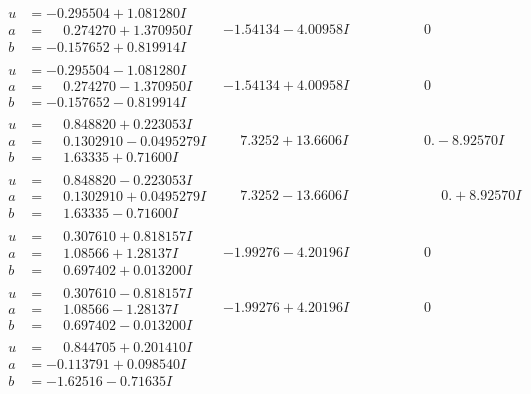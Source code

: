 \documentclass[1p]{elsarticle_modified}
\theoremstyle{definition}
\begin{document}
$$\begin{array}{c|c|c}
\begin{aligned}
u &= -0.295504 + 1.081280 I \\
a &= \phantom{-}0.274270 + 1.370950 I \\
b &= -0.157652 + 0.819914 I\end{aligned}
 & -1.54134 - 4.00958 I & \phantom{-0.000000 } 0 \\ \hline\begin{aligned}
u &= -0.295504 - 1.081280 I \\
a &= \phantom{-}0.274270 - 1.370950 I \\
b &= -0.157652 - 0.819914 I\end{aligned}
 & -1.54134 + 4.00958 I & \phantom{-0.000000 } 0 \\ \hline\begin{aligned}
u &= \phantom{-}0.848820 + 0.223053 I \\
a &= \phantom{-}0.1302910 - 0.0495279 I \\
b &= \phantom{-}1.63335 + 0.71600 I\end{aligned}
 & \phantom{-}7.3252 + 13.6606 I & \phantom{-0.000000 } 0. - 8.92570 I \\ \hline\begin{aligned}
u &= \phantom{-}0.848820 - 0.223053 I \\
a &= \phantom{-}0.1302910 + 0.0495279 I \\
b &= \phantom{-}1.63335 - 0.71600 I\end{aligned}
 & \phantom{-}7.3252 - 13.6606 I & \phantom{-0.000000 -}0. + 8.92570 I \\ \hline\begin{aligned}
u &= \phantom{-}0.307610 + 0.818157 I \\
a &= \phantom{-}1.08566 + 1.28137 I \\
b &= \phantom{-}0.697402 + 0.013200 I\end{aligned}
 & -1.99276 - 4.20196 I & \phantom{-0.000000 } 0 \\ \hline\begin{aligned}
u &= \phantom{-}0.307610 - 0.818157 I \\
a &= \phantom{-}1.08566 - 1.28137 I \\
b &= \phantom{-}0.697402 - 0.013200 I\end{aligned}
 & -1.99276 + 4.20196 I & \phantom{-0.000000 } 0 \\ \hline\begin{aligned}
u &= \phantom{-}0.844705 + 0.201410 I \\
a &= -0.113791 + 0.098540 I \\
b &= -1.62516 - 0.71635 I\end{aligned}

\end{array}$$
\end{document}
